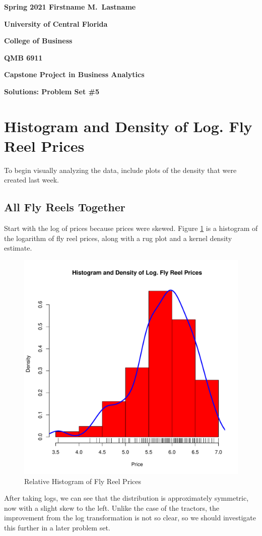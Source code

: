 \documentclass[11pt]{book}
\begin{document}

\pagestyle{empty}
{\noindent\bf Spring 2021 \hfill Firstname M.~Lastname}
\vskip 16pt
\centerline{\bf University of Central Florida}
\centerline{\bf College of Business}
\vskip 16pt
\centerline{\bf QMB 6911}
\centerline{\bf Capstone Project in Business Analytics}
\vskip 10pt
\centerline{\bf Solutions:  Problem Set \#5}
\vskip 32pt
\noindent




\section{Histogram and Density of Log. Fly Reel Prices}

To begin visually analyzing the data, 
include plots of the density that were created last week.

\subsection{All Fly Reels Together}

Start with the log of prices because prices were skewed.
Figure \ref{fig:hist_dens_log_price} is
a histogram of the logarithm of fly reel prices, 
along with a rug plot and a kernel density estimate. 
%
\begin{figure}[h!]
  \centering
  \includegraphics[scale = 0.5, keepaspectratio=true]{../Figures/hist_dens_log_price}
  \caption{Relative Histogram of Fly Reel Prices} \label{fig:hist_dens_log_price}
\end{figure}
% 
After taking logs, we can see that the distribution is
approximately symmetric, now with a slight skew to the left. 
Unlike the case of the tractors, 
the improvement from the log transformation is not so clear, 
so we should investigate this further in a later problem set. 
\end{document}
